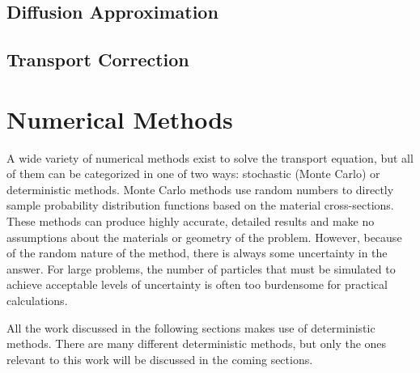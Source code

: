 
\subsection{Diffusion Approximation}


\subsection{Transport Correction}


\section{Numerical Methods}

A wide variety of numerical methods exist to solve the transport equation, but all of them can be categorized in one of two ways: stochastic (Monte Carlo) or deterministic methods.  Monte Carlo methods use random numbers to directly sample probability distribution functions based on the material cross-sections.  These methods can produce highly accurate, detailed results and make no assumptions about the materials or geometry of the problem.  However, because of the random nature of the method, there is always some uncertainty in the answer.  For large problems, the number of particles that must be simulated to achieve acceptable levels of uncertainty is often too burdensome  for practical calculations.

All the work discussed in the following sections makes use of deterministic methods.  There are many different deterministic methods, but only the ones relevant to this work will be discussed in the coming sections.

